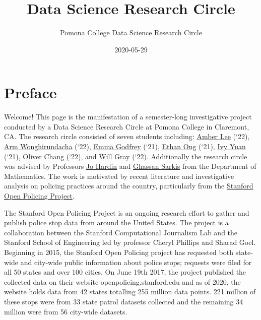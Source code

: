 \documentclass[
]{book}
\title{Data Science Research Circle}
\author{Pomona College Data Science Research Circle}
\date{2020-05-29}
\begin{document}
\maketitle

{
\setcounter{tocdepth}{1}
\tableofcontents
}
\hypertarget{preface}{%
\chapter{Preface}\label{preface}}

\quad Welcome! This page is the manifestation of a semester-long investigative project conducted by a Data Science Research Circle at Pomona College in Claremont, CA. The research circle consisted of seven students including: \href{https://github.com/Amber-Patricia-Lee}{Amber Lee} (`22), \href{https://github.com/armwong9}{Arm Wonghirundacha} (`22), \href{https://github.com/emmacgodfrey}{Emma Godfrey} (`21), \href{https://github.com/eruong}{Ethan Ong} (`21), \href{https://github.com/iyyuan1208}{Ivy Yuan} (`21), \href{https://github.com/oliverc1623}{Oliver Chang} (`22), and \href{https://github.com/wega2018}{Will Gray} (`22). Additionally the research circle was advised by Professors \href{https://research.pomona.edu/johardin/}{Jo Hardin} and \href{https://www.pomona.edu/directory/people/ghassan-y-sarkis}{Ghassan Sarkis} from the Department of Mathematics. The work is motivated by recent literature and investigative analysis on policing practices around the country, particularly from the \href{https://openpolicing.stanford.edu/}{Stanford Open Policing Project}.

\quad The Stanford Open Policing Project is an ongoing research effort to gather and publish police stop data from around the United States. The project is a collaboration between the Stanford Computational Journalism Lab and the Stanford School of Engineering led by professor Cheryl Phillips and Sharad Goel. Beginning in 2015, the Stanford Open Policing project has requested both state-wide and city-wide public information about police stops; requests were filed for all 50 states and over 100 cities. On June 19th 2017, the project published the collected data on their website openpolicing.stanford.edu and as of 2020, the website holds data from 42 states totalling 255 million data points. 221 million of these stops were from 33 state patrol datasets collected and the remaining 34 million were from 56 city-wide datasets.
\end{document}
